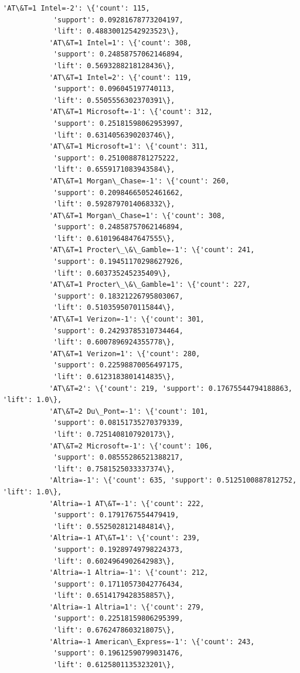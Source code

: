 \documentclass[11pt]{article}
\begin{document}
\begin{Verbatim}[commandchars=\\\{\}]
           'AT\&T=1 Intel=-2': \{'count': 115,
            'support': 0.09281678773204197,
            'lift': 0.48830012542923523\},
           'AT\&T=1 Intel=1': \{'count': 308,
            'support': 0.24858757062146894,
            'lift': 0.5693288218128436\},
           'AT\&T=1 Intel=2': \{'count': 119,
            'support': 0.096045197740113,
            'lift': 0.5505556302370391\},
           'AT\&T=1 Microsoft=-1': \{'count': 312,
            'support': 0.25181598062953997,
            'lift': 0.6314056390203746\},
           'AT\&T=1 Microsoft=1': \{'count': 311,
            'support': 0.2510088781275222,
            'lift': 0.6559171083943584\},
           'AT\&T=1 Morgan\_Chase=-1': \{'count': 260,
            'support': 0.20984665052461662,
            'lift': 0.5928797014068332\},
           'AT\&T=1 Morgan\_Chase=1': \{'count': 308,
            'support': 0.24858757062146894,
            'lift': 0.6101964847647555\},
           'AT\&T=1 Procter\_\&\_Gamble=-1': \{'count': 241,
            'support': 0.19451170298627926,
            'lift': 0.603735245235409\},
           'AT\&T=1 Procter\_\&\_Gamble=1': \{'count': 227,
            'support': 0.18321226795803067,
            'lift': 0.5103595070115844\},
           'AT\&T=1 Verizon=-1': \{'count': 301,
            'support': 0.24293785310734464,
            'lift': 0.6007896924355778\},
           'AT\&T=1 Verizon=1': \{'count': 280,
            'support': 0.22598870056497175,
            'lift': 0.6123183801414835\},
           'AT\&T=2': \{'count': 219, 'support': 0.17675544794188863, 'lift': 1.0\},
           'AT\&T=2 Du\_Pont=-1': \{'count': 101,
            'support': 0.08151735270379339,
            'lift': 0.7251408107920173\},
           'AT\&T=2 Microsoft=-1': \{'count': 106,
            'support': 0.08555286521388217,
            'lift': 0.7581525033337374\},
           'Altria=-1': \{'count': 635, 'support': 0.5125100887812752, 'lift': 1.0\},
           'Altria=-1 AT\&T=-1': \{'count': 222,
            'support': 0.1791767554479419,
            'lift': 0.5525028121484814\},
           'Altria=-1 AT\&T=1': \{'count': 239,
            'support': 0.19289749798224373,
            'lift': 0.6024964902642983\},
           'Altria=-1 Altria=-1': \{'count': 212,
            'support': 0.17110573042776434,
            'lift': 0.6514179428358857\},
           'Altria=-1 Altria=1': \{'count': 279,
            'support': 0.22518159806295399,
            'lift': 0.6762478603218075\},
           'Altria=-1 American\_Express=-1': \{'count': 243,
            'support': 0.19612590799031476,
            'lift': 0.6125801135323201\},

\end{Verbatim}
\end{document}
